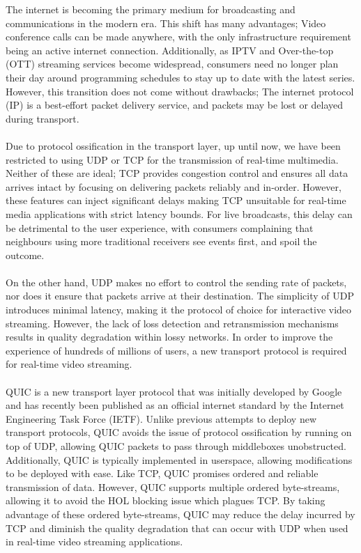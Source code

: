 \documentclass{mpaper}
\begin{document}
\noindent The internet is becoming the primary medium for broadcasting and communications in the modern era. This shift has many advantages; Video conference calls can be made anywhere, with the only infrastructure requirement being an active internet connection. Additionally, as IPTV and Over-the-top (OTT) streaming services become widespread, consumers need no longer plan their day around programming schedules to stay up to date with the latest series. However, this transition does not come without drawbacks; The internet protocol (IP\cite{IP}) is a best-effort packet delivery service, and packets may be lost or delayed during transport.
\\\\
Due to protocol ossification in the transport layer, up until now, we have been restricted to using UDP\cite{UDP} or TCP\cite{TCP} for the transmission of real-time multimedia. Neither of these are ideal; TCP provides congestion control and ensures all data arrives intact by focusing on delivering packets reliably and in-order. However, these features can inject significant delays making TCP unsuitable for real-time media applications with strict latency bounds. For live broadcasts, this delay can be detrimental to the user experience, with consumers complaining that neighbours using more traditional receivers see events first, and spoil the outcome\cite{LIVESURVEY}. 
\\\\
On the other hand, UDP makes no effort to control the sending rate of packets, nor does it ensure that packets arrive at their destination. The simplicity of UDP introduces minimal latency, making it the protocol of choice for interactive video streaming. However, the lack of loss detection and retransmission mechanisms results in quality degradation within lossy networks. In order to improve the experience of hundreds of millions of users, a new transport protocol is required for real-time video streaming.
\\\\
QUIC is a new transport layer protocol that was initially developed by Google and has recently been published as an official internet standard by the Internet Engineering Task Force (IETF)\cite{rfc9000, rfc9001, rfc9002, gQUIC}. Unlike previous attempts to deploy new transport protocols, QUIC avoids the issue of protocol ossification by running on top of UDP, allowing QUIC packets to pass through middleboxes unobstructed. Additionally, QUIC is typically implemented in userspace, allowing modifications to be deployed with ease. Like TCP, QUIC promises ordered and reliable transmission of data. However, QUIC supports multiple ordered byte-streams, allowing it to avoid the HOL blocking\cite{HOLBlocking} issue which plagues TCP. By taking advantage of these ordered byte-streams, QUIC may reduce the delay incurred by TCP and diminish the quality degradation that can occur with UDP when used in real-time video streaming applications.
\end{document}
